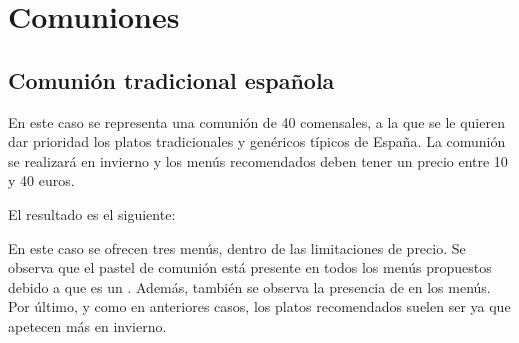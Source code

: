 \section{Comuniones}
\subsection{Comunión tradicional española}
En este caso se representa una comunión de 40 comensales, a la que se le quieren dar prioridad los platos tradicionales y genéricos
típicos de España. La comunión se realizará en invierno y los menús recomendados deben tener un precio entre 10 y 40 euros.

El resultado es el siguiente:


En este caso se ofrecen tres menús, dentro de las limitaciones de precio. Se observa que el pastel de comunión está presente en
todos los menús propuestos debido a que es un . Además, también se observa la presencia de
 en  los menús. Por último, y como en anteriores casos, los platos
recomendados suelen ser  ya que apetecen más en invierno.
